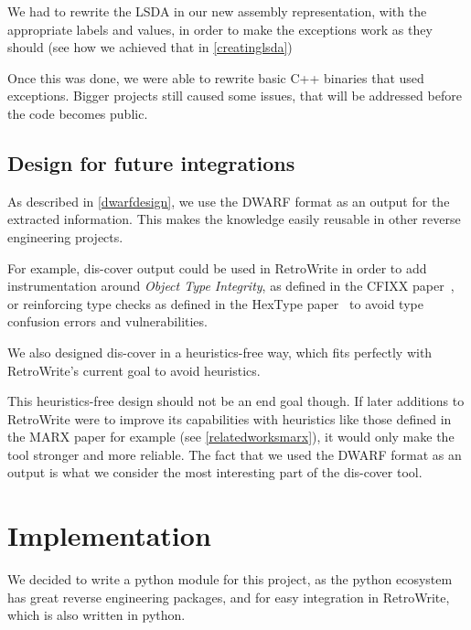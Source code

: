 \documentclass[a4paper,11pt,oneside]{report}
\begin{document}
We had to rewrite the LSDA in our new assembly representation, with the
appropriate labels and values, in order to make the exceptions work as they
should (see how we achieved that in \autoref{creatinglsda})

Once this was done, we were able to rewrite basic C++ binaries that used
exceptions.
Bigger projects still caused some issues, that will be addressed
before the code becomes public.


\section{Design for future integrations}

As described in \autoref{dwarfdesign}, we use the DWARF format as an output
for the extracted information. This makes the knowledge easily reusable in
other reverse engineering projects.

For example, dis-cover output could be used in RetroWrite in order to add
instrumentation around \emph{Object Type Integrity}, as defined in the CFIXX
paper~\cite{cfixx}, or reinforcing type checks as defined in the HexType
paper~\cite{hextype} to avoid type confusion errors and vulnerabilities.

We also designed dis-cover in a heuristics-free way, which fits perfectly with
RetroWrite's current goal to avoid heuristics.

This heuristics-free design should not be an end goal though.
If later additions to RetroWrite were to improve its capabilities with
heuristics like those defined in the MARX paper for example (see
\autoref{relatedworksmarx}), it would only make the tool stronger and more
reliable.
The fact that we used the DWARF format as an output is what we consider the
most interesting part of the dis-cover tool.


\chapter{Implementation}



We decided to write a python module for this project, as the python ecosystem 
has great reverse engineering packages, and for easy integration in RetroWrite, 
which is also written in python.
\end{document}
